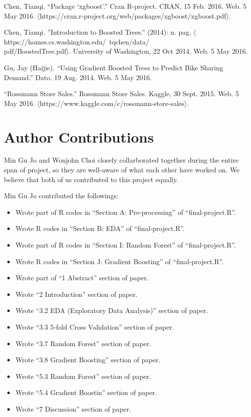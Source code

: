 \documentclass[letterpaper,twocolumn,11pt]{article}
\begin{document}
Chen, Tianqi. ``Package ‘xgboost'.'' Cran R-project. CRAN, 15 Feb. 2016. Web. 5 May 2016. $\langle$https://cran.r-project.org/web/packages/xgboost/xgboost.pdf$\rangle$.

Chen, Tianqi. ”Introduction to Boosted Trees.” (2014): n. pag. $\langle$https://homes.cs.washington.edu/~tqchen/data/\\
pdf/BoostedTree.pdf$\rangle$. University of Washington, 22 Oct 2014. Web. 5 May 2016.

Gu, Jay (Haijie). ``Using Gradient Boosted Trees to Predict Bike Sharing Demand.'' Dato. 19 Aug. 2014. Web. 5 May 2016.

``Rossmann Store Sales.'' Rossmann Store Sales. Kaggle, 30 Sept. 2015. Web. 5 May 2016. $\langle$https://www.kaggle.com/c/rossmann-store-sales$\rangle$.

\section{Author Contributions}
Min Gu Jo and Wonjohn Choi closely collarborated together during the entire span of project, so they are well-aware of what each other have worked on. We believe that both of us contributed to this project equally.

Min Gu Jo contributed the followings:
\begin{itemize}
\item Wrote part of R codes in ``Section A: Pre-processing'' of ``final-project.R''.
\item Wrote R codes in ``Section B: EDA'' of ``final-project.R''.
\item Wrote part of R codes in ``Section I: Random Forest'' of ``final-project.R''.
  \item Wrote R codes in ``Section J: Gradient Boosting'' of ``final-project.R''.
\item Wrote part of ``1 Abstract'' section of paper.
\item Wrote ``2 Introduction'' section of paper.
\item Wrote ``3.2 EDA (Exploratory Data Analysis)'' section of paper.
\item Wrote ``3.3 5-fold Cross Validation'' section of paper.
\item Wrote ``3.7 Random Forest'' section of paper.
\item Wrote ``3.8 Gradient Boosting'' section of paper.
\item Wrote ``5.3 Random Forest'' section of paper.
\item Wrote ``5.4 Gradient Boostin'' section of paper.
\item Wrote ``7 Discussion'' section of paper.
  
\end{itemize}
\end{document}
